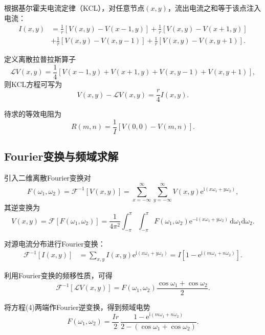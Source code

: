 \documentclass{article} %
\newcommand{\di}{\mathrm{d}}
\newcommand{\ii}{\mathrm{i}}
\newcommand{\e}[1]{\mathrm{e}^{#1}}
\newcommand{\f}[1]{\mathscr{F}\left[#1\right]}
\newcommand{\fo}[1]{\mathscr{F}^{-1}\left[#1\right]}
\begin{document}
根据基尔霍夫电流定律（KCL），对任意节点$(x,y)$，流出电流之和等于该点注入电流：
\begin{align}
  I(x,y)&=\frac{1}{r}\left[V(x,y)-V(x-1,y)\right]
        +\frac{1}{r}\left[V(x,y)-V(x+1,y)\right]\nonumber\\
        &+\frac{1}{r}\left[V(x,y)-V(x,y-1)\right]
        +\frac{1}{r}\left[V(x,y)-V(x,y+1)\right].
\end{align}

定义离散拉普拉斯算子
\begin{equation}
  \mathscr{L}V(x,y)=\frac{1}{4}\left[V(x-1,y)+V(x+1,y)
  +V(x,y-1)+V(x,y+1)\right],
\end{equation}
则KCL方程可写为
\begin{equation}
  V(x,y)-\mathcal{L}V(x,y)=\frac{r}{4}I(x,y).
\end{equation}

待求的等效电阻为
\begin{equation}
  R(m,n)=\frac{1}{I}\left[V(0,0)-V(m,n)\right].
\end{equation}

\subsection{Fourier变换与频域求解}

引入二维离散Fourier变换对
\begin{equation}
  F(\omega_1,\omega_2)=\fo{V(x,y)}
  =\sum_{x=-\infty}^{\infty}\sum_{y=-\infty}^{\infty}V(x,y)\e{\ii(x\omega_1+y\omega_2)},
\end{equation}
其逆变换为
\begin{equation}
  V(x,y)=\f{F(\omega_1,\omega_2)}
  =\frac{1}{4\pi^2}\int_{-\pi}^{\pi}\int_{-\pi}^{\pi}
  F(\omega_1,\omega_2)\e{-\ii(x\omega_1+y\omega_2)}\,\di\omega_1\di\omega_2.
\end{equation}

对源电流分布进行Fourier变换：
\begin{align}
  \fo{I(x,y)}
  &=\sum_{x,y}I(x,y)\e{\ii(x\omega_1+y\omega_2)}
  =I\left[1-\e{\ii(m\omega_1+n\omega_2)}\right].
\end{align}

利用Fourier变换的频移性质，可得
\begin{equation}
  \fo{\mathcal{L}V(x,y)}
  =F(\omega_1,\omega_2)\frac{\cos\omega_1+\cos\omega_2}{2}.
\end{equation}

将方程(4)两端作Fourier逆变换，得到频域电势
\begin{equation}
  F(\omega_1,\omega_2)=\frac{Ir}{2}\,
  \frac{1-\e{\ii(m\omega_1+n\omega_2)}}{2-(\cos\omega_1+\cos\omega_2)}.
\end{equation}
\end{document}
